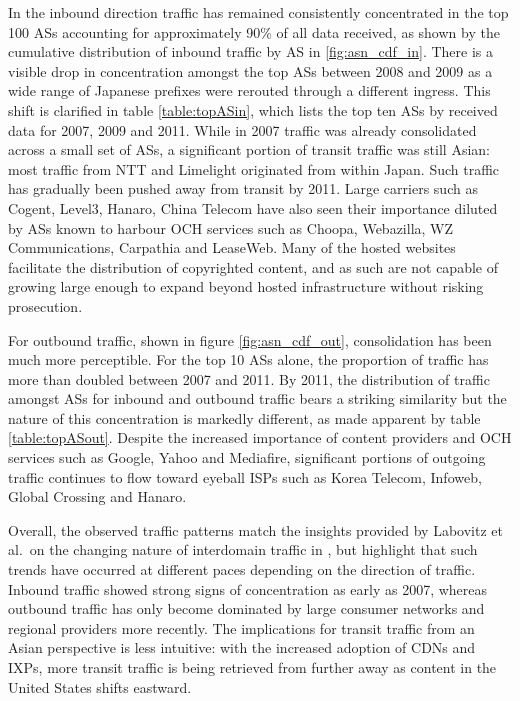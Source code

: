 In the inbound direction traffic has remained consistently concentrated in the top 100 \acp{AS} accounting for approximately 90\% of all data received, as shown by the cumulative distribution of inbound traffic by \acs{AS} in \ref{fig:asn_cdf_in}.
There is a visible drop in concentration amongst the top \acp{AS} between 2008 and 2009 as a wide range of Japanese prefixes were rerouted through a different ingress.
This shift is clarified in table \ref{table:topASin}, which lists the top ten \acp{AS} by received data for 2007, 2009 and 2011.
While in 2007 traffic was already consolidated across a small set of \acp{AS}, a significant portion of transit traffic was still Asian: most traffic from \acs{NTT} and Limelight originated from within Japan. 
Such traffic has gradually been pushed away from transit by 2011.
Large carriers such as Cogent, Level3, Hanaro, China Telecom have also seen their importance diluted by \acp{AS} known to harbour \ac{OCH} services such as Choopa, Webazilla, WZ Communications, Carpathia and LeaseWeb.
Many of the hosted websites facilitate the distribution of copyrighted content, and as such are not capable of growing large enough to expand beyond hosted infrastructure without risking prosecution.

For outbound traffic, shown in figure \ref{fig:asn_cdf_out}, consolidation has been much more perceptible. 
For the top 10 \acp{AS} alone, the proportion of traffic has more than doubled between 2007 and 2011. 
By 2011, the distribution of traffic amongst \acp{AS} for inbound and outbound traffic bears a striking similarity but the nature of this concentration is markedly different, as made apparent by table \ref{table:topASout}.
Despite the increased importance of content providers and \ac{OCH} services such as Google, Yahoo and Mediafire, significant portions of outgoing traffic continues to flow toward eyeball \acp{ISP} such as Korea Telecom, Infoweb, Global Crossing and Hanaro.

Overall, the observed traffic patterns match the insights provided by Labovitz et al.\ on the changing nature of interdomain traffic in \cite{Labovitz:2010p175}, but highlight that such trends have occurred at different paces depending on the direction of traffic. 
Inbound traffic showed strong signs of concentration as early as 2007, whereas outbound traffic has only become dominated by large consumer networks and regional providers more recently.
The implications for transit traffic from an Asian perspective is less intuitive: with the increased adoption of \acp{CDN} and \acp{IXP}, more transit traffic is being retrieved from further away as content in the United States shifts eastward.

